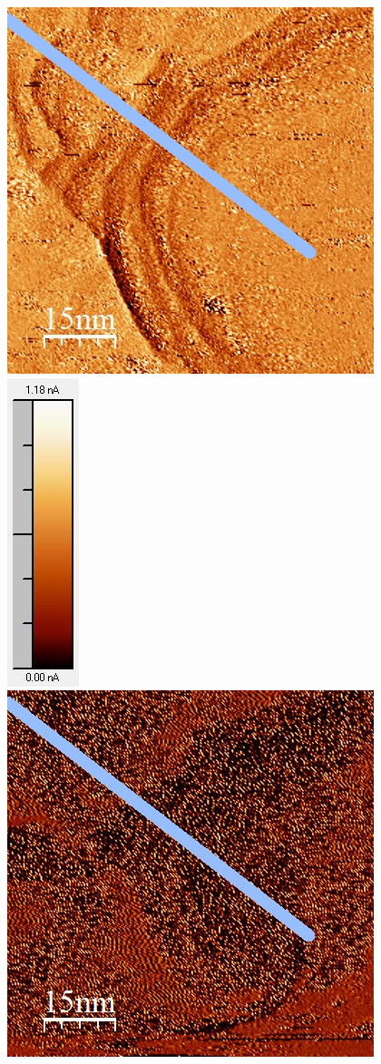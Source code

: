 \documentclass[12pt,a4paper]{article}
\begin{document}
\begin{figure}
\centering
\includegraphics[scale=0.6]{Bilder/Anhang/IGain/Strom/3000_IGain_Strom_nach.jpg}
\includegraphics[scale=0.6]{Bilder/Anhang/IGain/Strom/3000_IGain_Strom_nach_Skala.jpg}
\includegraphics[scale=0.6]{Bilder/Anhang/IGain/Strom/8000_IGain_Strom_vor.jpg}

\end{figure}
\end{document}
